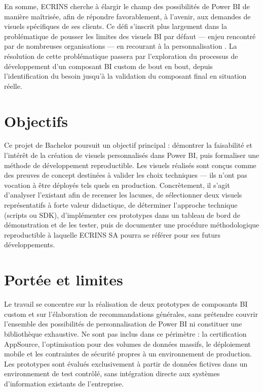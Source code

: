 En somme, ECRINS cherche à élargir le champ des possibilités de Power BI de manière maîtrisée, afin de répondre favorablement, à l’avenir, aux demandes de visuels spécifiques de ses clients. Ce défi s’inscrit plus largement dans la problématique de pousser les limites des visuels BI par défaut — enjeu rencontré par de nombreuses organisations — en recourant à la personnalisation \parencite{Uttam2025}. La résolution de cette problématique passera par l’exploration du processus de développement d’un composant BI custom de bout en bout, depuis l’identification du besoin jusqu’à la validation du composant final en situation réelle.  

\section{Objectifs}

Ce projet de Bachelor poursuit un objectif principal : démontrer la faisabilité et l’intérêt de la création de visuels personnalisés dans Power BI, puis formaliser une méthode de développement reproductible.  
Les visuels réalisés sont conçus comme des preuves de concept destinées à valider les choix techniques — ils n’ont pas vocation à être déployés tels quels en production.  
Concrètement, il s’agit d’analyser l’existant afin de recenser les lacunes, de sélectionner deux visuels représentatifs à forte valeur didactique, de déterminer l’approche technique (scripts ou SDK), d’implémenter ces prototypes dans un tableau de bord de démonstration et de les tester, puis de documenter une procédure méthodologique reproductible à laquelle ECRINS SA pourra se référer pour ses futurs développements.

\section{Portée et limites}


Le travail se concentre sur la réalisation de deux prototypes de composants BI custom et sur l’élaboration de recommandations générales, sans prétendre couvrir l’ensemble des possibilités de personnalisation de Power BI ni constituer une bibliothèque exhaustive. Ne sont pas inclus dans ce périmètre : la certification AppSource, l’optimisation pour des volumes de données massifs, le déploiement mobile et les contraintes de sécurité propres à un environnement de production. Les prototypes sont évalués exclusivement à partir de données fictives dans un environnement de test contrôlé, sans intégration directe aux systèmes d’information existants de l’entreprise.


